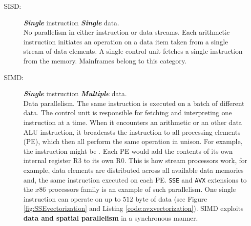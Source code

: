 \begin{description}
\item[SISD:] \textit{\textbf{Single}} instruction \textit{\textbf{Single}}
data.\hfill\\
No parallelism in either instruction or data streams.
Each arithmetic instruction initiates an operation on a data item taken from a single stream of data elements.
A single control unit fetches a single instruction from the memory.
Mainframes belong to this category.
\item[SIMD:] \textit{\textbf{Single}} instruction \textit{\textbf{Multiple}} data. \hfill \\ 
Data parallelism. The same instruction is executed on a batch of different data.
The control unit is responsible for fetching and interpreting one instruction at a time.
When it encounters an arithmetic or an other data ALU instruction, it broadcasts the instruction
to all processing elements (PE), which then all perform the same operation in unison.
For example, the instruction might be .
Each PE would add the contents of its own internal register R3 to its own R0.
This is how stream processors work, for example, data elements are distributed across all available data memories and, the same instruction executed on each PE.
\texttt{SSE} and \texttt{AVX} extensions to the $x86$ processors family is an example of such parallelism.
One single instruction can operate on up to $512$ byte of data (see Figure \ref{fig:SSEvectorization} and Listing \ref{code:avxvectorization}).
SIMD exploits \textbf{data and spatial parallelism} in a synchronous manner.
\end{description}
